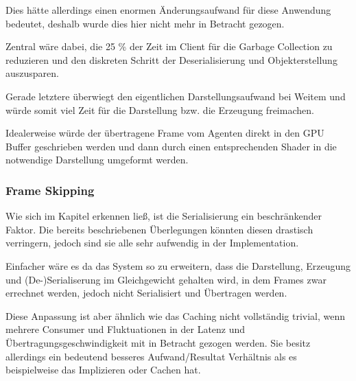 Dies hätte allerdings einen enormen Änderungsaufwand für diese Anwendung bedeutet, deshalb wurde dies hier nicht mehr in Betracht gezogen.

Zentral wäre dabei, die 25 \% der Zeit im Client für die Garbage Collection zu reduzieren und den diskreten Schritt der Deserialisierung und Objekterstellung auszusparen.

Gerade letztere überwiegt den eigentlichen Darstellungsaufwand bei Weitem und würde somit viel Zeit für die Darstellung bzw. die Erzeugung freimachen.

Idealerweise würde der übertragene Frame vom Agenten direkt in den GPU Buffer geschrieben werden und dann durch einen entsprechenden Shader in die notwendige Darstellung umgeformt werden.

\subsubsection{Frame Skipping}

Wie sich im Kapitel  erkennen ließ, ist die Serialisierung ein beschränkender Faktor.
Die bereits beschriebenen Überlegungen könnten diesen drastisch verringern, jedoch sind sie alle sehr aufwendig in der Implementation.

Einfacher wäre es da das System so zu erweitern, dass die Darstellung, Erzeugung und (De-)Serialiserung im Gleichgewicht gehalten wird, in dem Frames zwar errechnet werden, jedoch nicht Serialisiert und Übertragen werden.

Diese Anpassung ist aber ähnlich wie das Caching nicht vollständig trivial, wenn mehrere Consumer und Fluktuationen in der Latenz und Übertragungsgeschwindigkeit mit in Betracht gezogen werden.
Sie besitz allerdings ein bedeutend besseres Aufwand/Resultat Verhältnis als es beispielweise das Implizieren oder Cachen hat.
